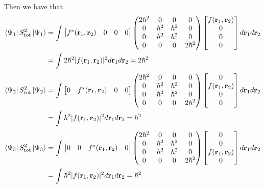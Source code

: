 \documentclass[12pt]{report}
\theoremstyle{custom}
\newcommand{\rb}{\bold{r}}
\begin{document}
Then we have that 
\begin{align*}
\bra{\Psi_1}S_{\text{tot}}^2 \ket{\Psi_1} &= \int \begin{bmatrix} f^*(\rb_1,\rb_2) & 0 & 0 & 0 \end{bmatrix} \begin{pmatrix}2\hbar^2 & 0 & 0 & 0 \\ 0 & \hbar^2 & \hbar^2 & 0 \\ 0 & \hbar^2 & \hbar^2 & 0 \\ 0 & 0 & 0 & 2\hbar^2\end{pmatrix}  \begin{bmatrix} f(\rb_1,\rb_2) \\ 0 \\ 0 \\ 0 \end{bmatrix} d\rb_1 d\rb_2 \\
                                          &=  \int 2\hbar^2 |f(\rb_1,\rb_2)|^2 d\rb_1 d\rb_2  = 2\hbar^2 
\end{align*}
\begin{align*}
\bra{\Psi_2}S_{\text{tot}}^2 \ket{\Psi_2} &= \int \begin{bmatrix} 0 & f^*(\rb_1,\rb_2) & 0 & 0 \end{bmatrix} \begin{pmatrix}2\hbar^2 & 0 & 0 & 0 \\ 0 & \hbar^2 & \hbar^2 & 0 \\ 0 & \hbar^2 & \hbar^2 & 0 \\ 0 & 0 & 0 & 2\hbar^2\end{pmatrix}  \begin{bmatrix} 0 \\ f(\rb_1,\rb_2)\\ 0 \\ 0 \end{bmatrix} d\rb_1 d\rb_2 \\
                                          &=  \int \hbar^2 |f(\rb_1,\rb_2)|^2 d\rb_1 d\rb_2 = \hbar^2
\end{align*}
\begin{align*}
  \bra{\Psi_3}S_{\text{tot}}^2 \ket{\Psi_3} &= \int \begin{bmatrix} 0 & 0 & f^*(\rb_1,\rb_2) & 0 \end{bmatrix} \begin{pmatrix}2\hbar^2 & 0 & 0 & 0 \\ 0 & \hbar^2 & \hbar^2 & 0 \\ 0 & \hbar^2 & \hbar^2 & 0 \\ 0 & 0 & 0 & 2\hbar^2\end{pmatrix}  \begin{bmatrix} 0 \\ 0 \\ f(\rb_1,\rb_2)\\ 0 \end{bmatrix} d\rb_1 d\rb_2 \\
                                            &=  \int \hbar^2 |f(\rb_1,\rb_2)|^2 d\rb_1 d\rb_2 = \hbar^2
\end{align*}
\end{document}
